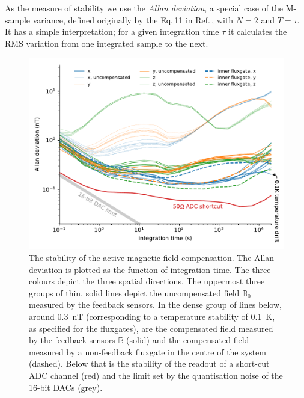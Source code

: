As the measure of stability we use the \emph{Allan deviation}, a special case of the M-sample variance, defined originally by the Eq.\,11 in Ref.\,\cite{Allan1966}, with $N=2$ and $T = \tau$.
It has a simple interpretation; for a given integration time $\tau$ it calculates the RMS variation from one integrated sample to the next.

\begin{figure}
  \centering
  \includegraphics[width=\linewidth]{gfx/prototype/run8_field_stability.pdf}
  \caption{The stability of the active magnetic field compensation.
  The Allan deviation is plotted as the function of integration time.
  The three colours depict the three spatial directions.
  The uppermost three groups of thin, solid lines depict the uncompensated field $\mathbb{B}_0$ measured by the feedback sensors.
  In the dense group of lines below, around \SI{0.3}{\nano\tesla} (corresponding to a temperature stability of \SI{0.1}{\kelvin}, as specified for the fluxgates), are
  the compensated field measured by the feedback sensors $\mathbb{B}$ (solid) and the compensated field measured by a non-feedback fluxgate in the centre of the system (dashed).
  Below that is the stability of the readout of a short-cut ADC channel (red) and the limit set by the quantisation noise of the 16-bit DACs (grey).}\label{fig:prototype_stability}
\end{figure}

